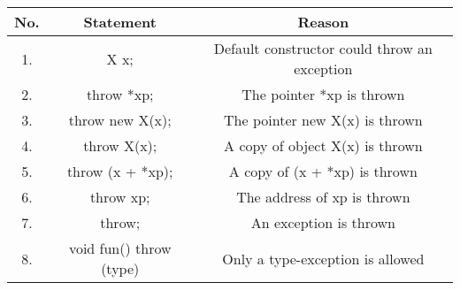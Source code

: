 \documentclass[11pt]{article}
\begin{document}
\begin{tabular}{|c|c|c|}
\hline
No. & Statement & Reason \\ \hline
1. & X x; & Default constructor could throw an exception \\ \hline
2. & throw *xp; & The pointer *xp is thrown \\ \hline
3. & throw new X(x); & The pointer new X(x) is thrown \\ \hline
4. & throw X(x); & A copy of object X(x) is thrown \\ \hline
5. & throw (x + *xp); & A copy of (x + *xp) is thrown \\ \hline
6. & throw xp; & The address of xp is thrown \\ \hline
7. & throw; & An exception is thrown \\ \hline
8. & void fun() throw (type) & Only a type-exception is allowed \\ \hline
\end{tabular}
\end{document}
